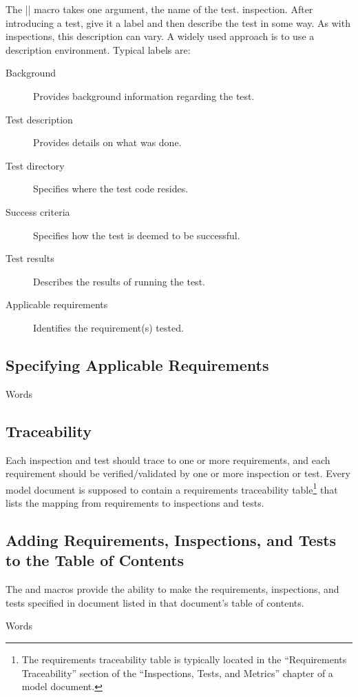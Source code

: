 The |\test| macro takes one argument, the name of the test.
inspection. After introducing a test, give it a label and then describe
the test in some way. As with inspections, this description can vary.
A widely used approach is to use a description environment. Typical labels are:
\begin{description}
\item[Background] Provides background information regarding the test.
\item[Test description] Provides details on what was done.
\item[Test directory] Specifies where the test code resides.
\item[Success criteria] Specifies how the test is deemed to be successful.
\item[Test results] Describes the results of running the test.
\item[Applicable requirements] Identifies the requirement(s) tested.
\end{description}

\subsection{Specifying Applicable Requirements}
Words


\subsection{Traceability}
Each inspection and test should trace to one or more requirements, and each
requirement should be verified/validated by one or more inspection or test.
Every model document is supposed to contain a requirements
traceability table\footnote{
  The requirements traceability table is typically located in the
  ``Requirements Traceability'' section of the ``Inspections, Tests, and
  Metrics'' chapter of a model document.} %
that lists the mapping from requirements to inspections and tests.
 

\subsection[Adding Requirements etc. to the TOC]
{Adding Requirements, Inspections, and Tests to the Table of Contents}
\label{sec:add_to_toc}
The  and  macros
provide the ability to make the requirements, inspections, and tests
specified in document listed in that document's table of contents.

Words
